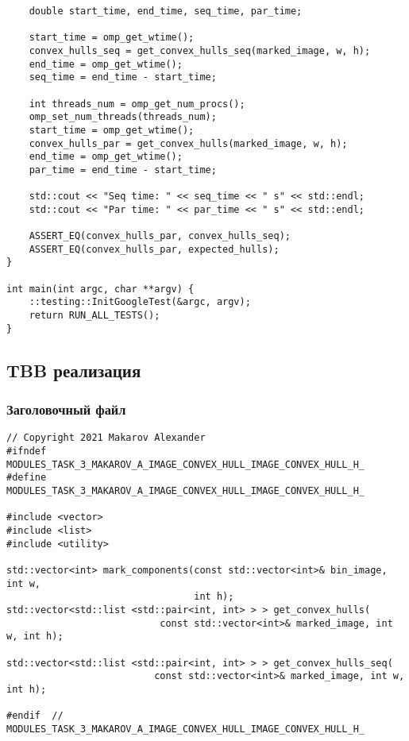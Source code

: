 \documentclass{report}
\begin{document}
\begin{lstlisting}
    double start_time, end_time, seq_time, par_time;

    start_time = omp_get_wtime();
    convex_hulls_seq = get_convex_hulls_seq(marked_image, w, h);
    end_time = omp_get_wtime();
    seq_time = end_time - start_time;

    int threads_num = omp_get_num_procs();
    omp_set_num_threads(threads_num);
    start_time = omp_get_wtime();
    convex_hulls_par = get_convex_hulls(marked_image, w, h);
    end_time = omp_get_wtime();
    par_time = end_time - start_time;

    std::cout << "Seq time: " << seq_time << " s" << std::endl;
    std::cout << "Par time: " << par_time << " s" << std::endl;

    ASSERT_EQ(convex_hulls_par, convex_hulls_seq);
    ASSERT_EQ(convex_hulls_par, expected_hulls);
}

int main(int argc, char **argv) {
    ::testing::InitGoogleTest(&argc, argv);
    return RUN_ALL_TESTS();
}
\end{lstlisting}

\subsection*{TBB реализация}
\subsubsection*{Заголовочный файл}
\begin{lstlisting}
// Copyright 2021 Makarov Alexander
#ifndef MODULES_TASK_3_MAKAROV_A_IMAGE_CONVEX_HULL_IMAGE_CONVEX_HULL_H_
#define MODULES_TASK_3_MAKAROV_A_IMAGE_CONVEX_HULL_IMAGE_CONVEX_HULL_H_

#include <vector>
#include <list>
#include <utility>

std::vector<int> mark_components(const std::vector<int>& bin_image, int w,
                                 int h);
std::vector<std::list <std::pair<int, int> > > get_convex_hulls(
                           const std::vector<int>& marked_image, int w, int h);

std::vector<std::list <std::pair<int, int> > > get_convex_hulls_seq(
                          const std::vector<int>& marked_image, int w, int h);

#endif  // MODULES_TASK_3_MAKAROV_A_IMAGE_CONVEX_HULL_IMAGE_CONVEX_HULL_H_
\end{lstlisting}
\end{document}
